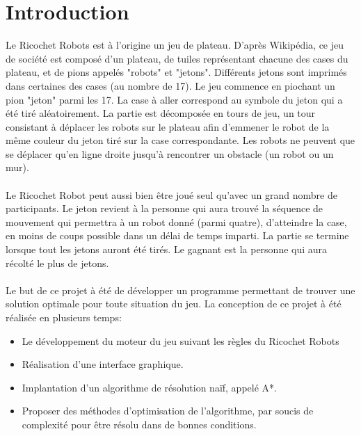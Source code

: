 \documentclass[a4paper, 12pt]{article}
\begin{document}
\section{Introduction}
Le Ricochet Robots est à l'origine un jeu de plateau. D'après Wikipédia\cite{Wikipedia}, ce jeu de société est composé d'un plateau, de tuiles représentant chacune des cases du plateau, et de pions appelés "robots" et "jetons". Différents jetons sont imprimés dans certaines des cases (au nombre de 17). Le jeu commence en piochant un pion "jeton" parmi les 17. La case à aller correspond au symbole du jeton qui a été tiré aléatoirement. La partie est décomposée en tours de jeu, un tour consistant à déplacer les robots sur le plateau afin d'emmener le robot de la même couleur du jeton tiré sur la case correspondante. Les robots ne peuvent que se déplacer qu'en ligne droite jusqu'à rencontrer un obstacle (un robot ou un mur).

    \paragraph{}
    Le Ricochet Robot peut aussi bien être joué seul qu'avec un grand nombre de participants. Le jeton revient à la personne qui aura trouvé la séquence de mouvement qui permettra à un robot donné (parmi quatre), d'atteindre la case, en moins de coups possible dans un délai de temps imparti. La partie se termine lorsque tout les jetons auront été tirés. Le gagnant est la personne qui aura récolté le plus de jetons.
    
    \paragraph{}
    Le but de ce projet à été de développer un programme permettant de trouver une solution optimale pour toute situation du jeu. La conception de ce projet à été réalisée en plusieurs temps:
        \begin{itemize}
            \item Le développement du moteur du jeu suivant les règles du Ricochet Robots
            \item Réalisation d'une interface graphique.
            \item Implantation d'un algorithme de résolution naïf, appelé A*.
            \item Proposer des méthodes d'optimisation de l'algorithme, par soucis de complexité pour être résolu dans de bonnes conditions.
        \end{itemize}
\end{document}
